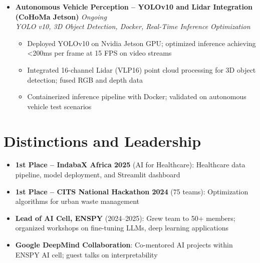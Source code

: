 \documentclass[a4paper,11pt]{article}
\begin{document}
\begin{itemize}[leftmargin=*, label={-}]
\item \textbf{Autonomous Vehicle Perception -- YOLOv10 and Lidar Integration (CoHoMa Jetson)} \hfill \textit{Ongoing} \\
\textit{YOLO v10, 3D Object Detection, Docker, Real-Time Inference Optimization} \vspace{-2pt}
    \begin{itemize}[leftmargin=0.4cm, nosep, label=\tiny$\bullet$]
        \item Deployed YOLOv10 on Nvidia Jetson GPU; optimized inference achieving <200ms per frame at 15 FPS on video streams
        \item Integrated 16-channel Lidar (VLP16) point cloud processing for 3D object detection; fused RGB and depth data
        \item Containerized inference pipeline with Docker; validated on autonomous vehicle test scenarios
    \end{itemize}

\end{itemize}

\vspace{4pt}

\section{Distinctions and Leadership}
\begin{itemize}[leftmargin=*, nosep]
    \item \textbf{1st Place -- IndabaX Africa 2025} (AI for Healthcare): Healthcare data pipeline, model deployment, and Streamlit dashboard
    \item \textbf{1st Place -- CITS National Hackathon 2024} (75 teams): Optimization algorithms for urban waste management
    \item \textbf{Lead of AI Cell, ENSPY} (2024--2025): Grew team to 50+ members; organized workshops on fine-tuning LLMs, deep learning applications
    \item \textbf{Google DeepMind Collaboration}: Co-mentored AI projects within ENSPY AI cell; guest talks on interpretability
\end{itemize}
\end{document}
